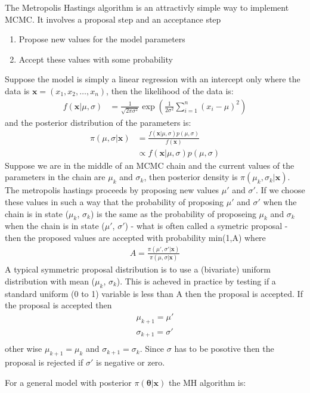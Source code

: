 \documentclass[12pt,a4paper]{article}
\begin{document}
The Metropolis Hastings algorithm is an attractivly simple way to implement MCMC.  It involves a proposal step and an acceptance step
\begin{enumerate}
  \item Propose new values for the model parameters
  \item Accept these values with some probability
\end{enumerate}
Suppose the model is simply a linear regression with an intercept only where the data is $\bm{x} = (x_1, x_2, \ldots, x_n)$, then the likelihood of the data is:
\begin{align*}
  f(\bm{x}|\mu,\sigma) &= \frac{1}{\sqrt{2\pi\sigma^2}} \exp \left(\frac{1}{2\sigma^2} \sum_{i=1}^n (x_i - \mu)^2 \right)
\end{align*}
and the posterior distribution of the parameters is:
\begin{align*}
  \pi(\mu,\sigma|\bm{x}) &= \frac{f(\bm{x}|\mu,\sigma) p(\mu, \sigma)}{f(\bm{x})} \\
                         &\propto f(\bm{x}|\mu,\sigma) p(\mu, \sigma)
\end{align*}
Suppose we are  in the middle of an MCMC chain and the current values of the parameters in the chain are $\mu_k$ and $\sigma_k$, then posterior density is $\pi(\mu_k, \sigma_k|\bm{x})$.  The metropolis hastings proceeds by proposing new values $\mu'$ and $\sigma'$.  If we choose these values in such a way that the probability of proposing $\mu'$ and $\sigma'$ when the chain is in state ($\mu_k$, $\sigma_k$) is the same as the probability of proposeing $\mu_k$ and $\sigma_k$ when the chain is in state ($\mu'$, $\sigma'$) - what is often called a symetric proposal - then the proposed values are accepted with probability min(1,A) where
\begin{align*}
  A = \frac{\pi(\mu',\sigma'|\bm{x})}{\pi(\mu,\sigma|\bm{x})}
\end{align*}
A typical symmetric proposal distribution is to use a (bivariate) uniform distribution with mean ($\mu_k$, $\sigma_k$).  This is acheved in practice by testing if a standard uniform (0 to 1) variable is less than A then the proposal is accepted.  If the proposal is accepted then 
\begin{align*}
  \mu_{k+1} = \mu' \\
  \sigma_{k+1} = \sigma' \\
\end{align*}
other wise $\mu_{k+1} = \mu_k$ and $\sigma_{k+1} = \sigma_k$.  Since $\sigma$ has to be posotive then the proposal is rejected if $\sigma'$ is negative or zero.

For a general model with posterior $\pi(\bm{\theta}|\bm{x})$ the MH algorithm is:
\end{document}
